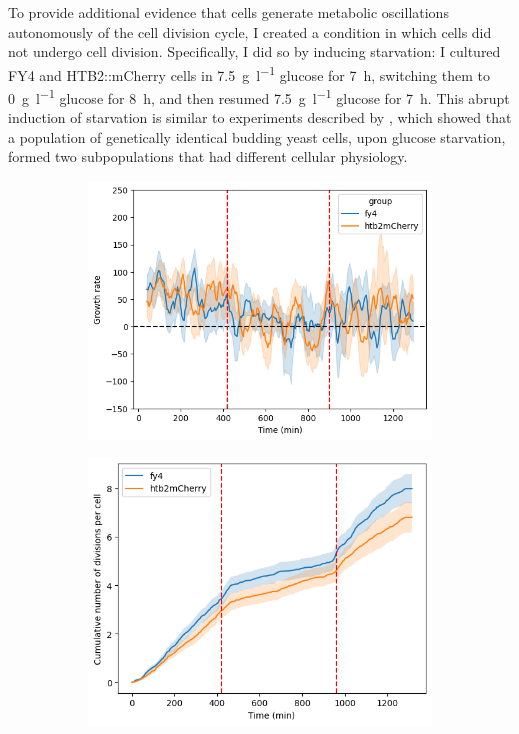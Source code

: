 To provide additional evidence that cells generate metabolic oscillations autonomously of the cell division cycle, I created a condition in which cells did not undergo cell division.
Specifically, I did so by inducing starvation: I cultured FY4 and HTB2::mCherry cells in \SI{7.5}{\gram~\litre^{-1}} glucose for \SI{7}{\hour}, switching them to \SI{0}{\gram~\litre^{-1}} glucose for \SI{8}{\hour}, and then resumed \SI{7.5}{\gram~\litre^{-1}} glucose for \SI{7}{\hour}.
This abrupt induction of starvation is similar to experiments described by \textcite{bagameryPutativeBetHedgingStrategy2020}, which showed that a population of genetically identical budding yeast cells, upon glucose starvation, formed two subpopulations that had different cellular physiology.


\begin{figure}
  \centering
  \begin{subfigure}[htpb]{0.45\textwidth}
   \centering
   \includegraphics[width=\textwidth]{allstrains_19972_gr}
   \caption{
   }
   \label{fig:biology-starvation-gr}
  \end{subfigure}%
  \begin{subfigure}[htpb]{0.45\textwidth}
   \centering
   \includegraphics[width=\textwidth]{allstrains_19972_cumul}
   \caption{
   }
   \label{fig:biology-starvation-cumul}
  \end{subfigure}


\end{figure}
